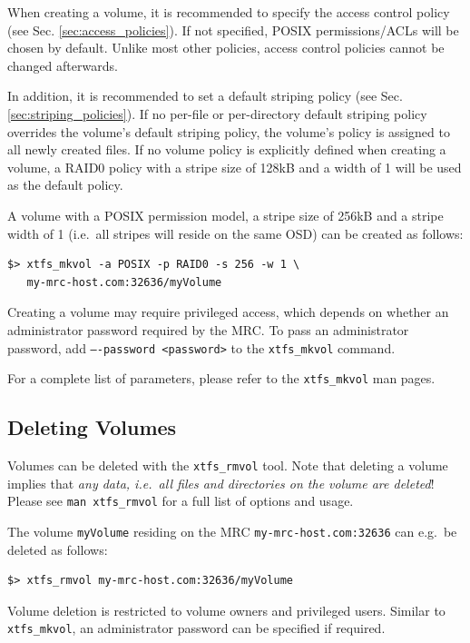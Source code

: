 \documentclass[a4paper,10pt]{book}
\begin{document}
When creating a volume, it is recommended to specify the access control policy (see Sec. \ref{sec:access_policies}). If not specified, POSIX permissions/ACLs will be chosen by default. Unlike most other policies, access control policies cannot be changed afterwards.

In addition, it is recommended to set a default striping policy (see Sec. \ref{sec:striping_policies}). If no per-file or per-directory default striping policy overrides the volume's default striping policy, the volume's policy is assigned to all newly created files. If no volume policy is explicitly defined when creating a volume, a RAID0 policy with a stripe size of 128kB and a width of 1 will be used as the default policy.

A volume with a POSIX permission model, a stripe size of 256kB and a stripe width of 1 (i.e.\ all stripes will reside on the same OSD) can be created as follows:


\begin{verbatim}
$> xtfs_mkvol -a POSIX -p RAID0 -s 256 -w 1 \
   my-mrc-host.com:32636/myVolume
\end{verbatim}

Creating a volume may require privileged access, which depends on whether an administrator password required by the MRC. To pass an administrator password, add \texttt{----password <password>} to the \texttt{xtfs\_mkvol} command.

For a complete list of parameters, please refer to the \texttt{xtfs\_mkvol} man pages.

\subsection{Deleting Volumes}

Volumes can be deleted with the \texttt{xtfs\_rmvol} tool. Note that deleting a volume implies that \emph{any data, i.e.\ all files and directories on the volume are deleted}! Please see \texttt{man xtfs\_rmvol} for a full list of options and usage.

The volume \texttt{myVolume} residing on the MRC \texttt{my-mrc-host.com:32636} can e.g.\ be deleted as follows:

\begin{verbatim}
$> xtfs_rmvol my-mrc-host.com:32636/myVolume
\end{verbatim}

Volume deletion is restricted to volume owners and privileged users. Similar to \texttt{xtfs\_mkvol}, an administrator password can be specified if required.
\end{document}
